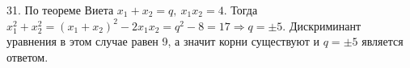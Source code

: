 31. По теореме Виета $x_1+x_2=q,\ x_1x_2=4.$ Тогда $x_1^2+x_2^2=(x_1+x_2)^2-2x_1x_2=q^2-8=17\Rightarrow q=\pm5.$ Дискриминант уравнения в этом случае равен 9, а значит корни существуют и $q=\pm5$ является ответом.\\
